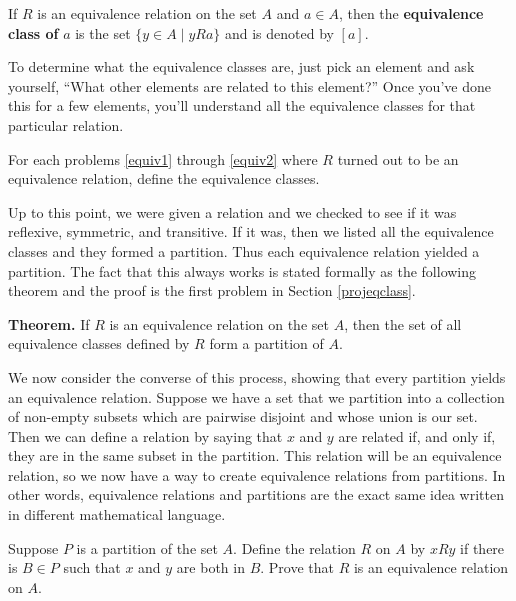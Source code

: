 \begin{dfn}
If $R$ is an equivalence relation on the set $A$ and  $a \in A$, then the \textbf{equivalence class of} $a$ is the set $\{y \in A  \mid  yRa\}$ and is denoted by $[a]$.
\end{dfn}

To determine what the equivalence classes are, just pick an element and ask yourself, ``What other elements are related to this element?''  Once you've done this for a few elements, you'll understand all the equivalence classes for that particular relation.

\begin{prb}
For each problems \ref{equiv1} through \ref{equiv2} where $R$ turned out to be an equivalence relation, define the equivalence classes.
\end{prb}

Up to this point, we were given a relation and we checked to see if it was reflexive, symmetric, and transitive.  If it was, then we listed all the equivalence classes and they formed a partition.  Thus each equivalence relation yielded  a partition.  The fact that this always works is stated formally as the following theorem and the proof is the first problem in Section \ref{projeqclass}.

\medskip

\noindent\textbf{Theorem.}  If $R$ is an equivalence relation on the set $A$, then the set of all equivalence classes defined by $R$ form a partition of $A$.

\medskip

We now consider the converse of this process, showing that every partition yields an equivalence relation.  Suppose we have a set that we partition into a collection of non-empty subsets which are pairwise disjoint and whose union is our set. Then we can define a relation by saying that $x$ and $y$ are related if, and only if, they are in the same subset in the partition.  This relation will be an equivalence relation, so we now have a way to create equivalence relations from partitions.  In other words, equivalence relations and partitions are the exact same idea written in different mathematical language.

\begin{prb}
Suppose $P$ is a partition of the set $A$.  Define the relation $R$ on $A$ by $xRy$ if there is $B \in P$ such that $x$ and $y$ are both in $B$.  Prove that $R$ is an equivalence relation on $A$.
\end{prb}


